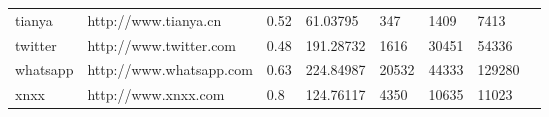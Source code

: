 \begin{table}[]
{\begin{tabular}{llllllll}
tianya                                & http://www.tianya.cn             & 0.52                                                                                                    & 61.03795                                                                                              & 347                                                                                & 1409                                                                              & 7413                                                                                     &                                                                                             \\
twitter                               & http://www.twitter.com           & 0.48                                                                                                    & 191.28732                                                                                             & 1616                                                                               & 30451                                                                             & 54336                                                                                    &                                                                                             \\
whatsapp                              & http://www.whatsapp.com          & 0.63                                                                                                    & 224.84987                                                                                             & 20532                                                                              & 44333                                                                             & 129280                                                                                   &                                                                                             \\
xnxx                                  & http://www.xnxx.com              & 0.8                                                                                                     & 124.76117                                                                                             & 4350                                                                               & 10635                                                                             & 11023                                                                                    &                                                                                             \\

\end{tabular}}
\end{table}
